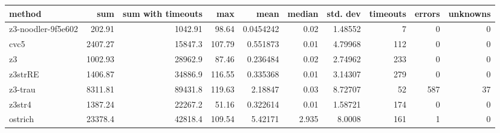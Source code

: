 \begin{tabular}{lrrrrrrrrr}
\hline
 method             &      sum &   sum with timeouts &    max &      mean &   median &   std. dev &   timeouts &   errors &   unknowns \\
\hline
 z3-noodler-9f5e602 &   202.91 &             1042.91 &  98.64 & 0.0454242 &    0.02  &    1.48552 &          7 &        0 &          0 \\
 cvc5               &  2407.27 &            15847.3  & 107.79 & 0.551873  &    0.01  &    4.79968 &        112 &        0 &          0 \\
 z3                 &  1002.93 &            28962.9  &  87.46 & 0.236484  &    0.02  &    2.74962 &        233 &        0 &          0 \\
 z3strRE            &  1406.87 &            34886.9  & 116.55 & 0.335368  &    0.01  &    3.14307 &        279 &        0 &          0 \\
 z3-trau            &  8311.81 &            89431.8  & 119.63 & 2.18847   &    0.03  &    8.72707 &         52 &      587 &         37 \\
 z3str4             &  1387.24 &            22267.2  &  51.16 & 0.322614  &    0.01  &    1.58721 &        174 &        0 &          0 \\
 ostrich            & 23378.4  &            42818.4  & 109.54 & 5.42171   &    2.935 &    8.0008  &        161 &        1 &          0 \\
\hline
\end{tabular}
